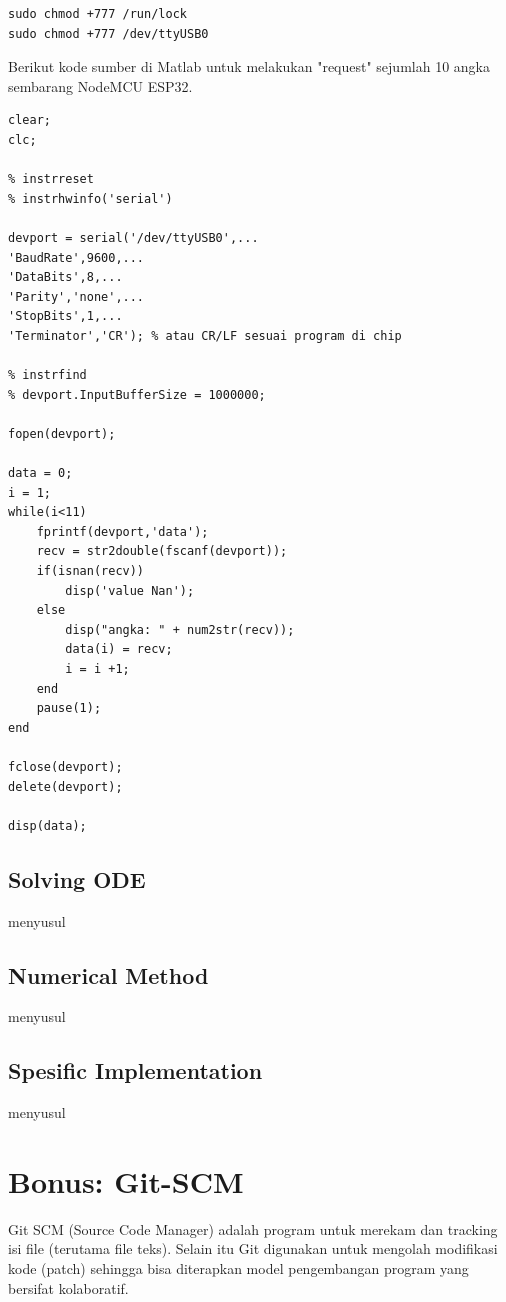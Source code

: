 \documentclass[12pt]{book}
\begin{document}
	\begin{verbatim}
sudo chmod +777 /run/lock
sudo chmod +777 /dev/ttyUSB0
	\end{verbatim}

	Berikut kode sumber di Matlab untuk melakukan "request" sejumlah 10 angka sembarang NodeMCU ESP32.

	\begin{verbatim}
clear;
clc;

% instrreset
% instrhwinfo('serial')

devport = serial('/dev/ttyUSB0',...
'BaudRate',9600,...
'DataBits',8,...
'Parity','none',...
'StopBits',1,...
'Terminator','CR'); % atau CR/LF sesuai program di chip

% instrfind
% devport.InputBufferSize = 1000000;

fopen(devport);

data = 0;
i = 1;
while(i<11)
	fprintf(devport,'data');
	recv = str2double(fscanf(devport));
	if(isnan(recv))
		disp('value Nan');
	else
		disp("angka: " + num2str(recv));
		data(i) = recv;
		i = i +1;
	end
	pause(1);
end

fclose(devport);
delete(devport);

disp(data);
	\end{verbatim}

	\section{Solving ODE}
	
	menyusul
	
	\section{Numerical Method}
	
	menyusul
	
	\section{Spesific Implementation}
	
	menyusul
	
	\chapter{Bonus: Git-SCM}
	
	Git SCM (Source Code Manager) adalah program untuk merekam dan tracking isi file (terutama file teks).
	Selain itu Git digunakan untuk mengolah modifikasi kode (patch) sehingga bisa diterapkan
	model pengembangan program yang bersifat kolaboratif.\\
	
\end{document}
